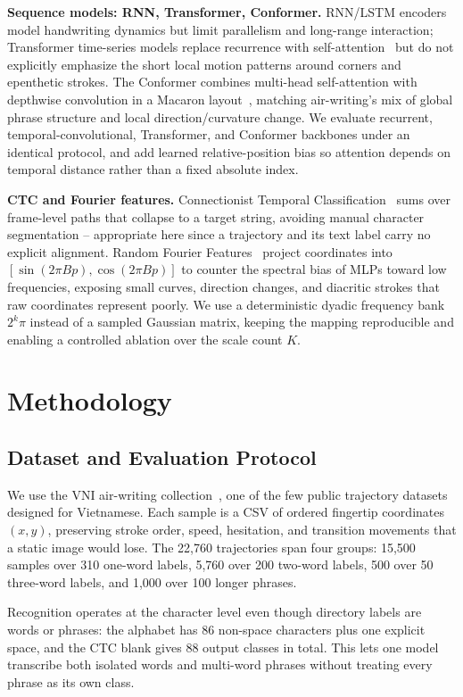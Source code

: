 \documentclass[runningheads]{llncs}
\begin{document}
\noindent\textbf{Sequence models: RNN, Transformer, Conformer.} RNN/LSTM encoders~\cite{rumelhart,hochreiter,ott} model handwriting dynamics but limit parallelism and long-range interaction; Transformer time-series models replace recurrence with self-attention~\cite{zerveas,zheng} but do not explicitly emphasize the short local motion patterns around corners and epenthetic strokes. The Conformer combines multi-head self-attention with depthwise convolution in a Macaron layout~\cite{conformer}, matching air-writing's mix of global phrase structure and local direction/curvature change. We evaluate recurrent, temporal-convolutional, Transformer, and Conformer backbones under an identical protocol, and add learned relative-position bias so attention depends on temporal distance rather than a fixed absolute index.

\noindent\textbf{CTC and Fourier features.} Connectionist Temporal Classification~\cite{ctc} sums over frame-level paths that collapse to a target string, avoiding manual character segmentation -- appropriate here since a trajectory and its text label carry no explicit alignment. Random Fourier Features~\cite{fourier} project coordinates into $[\sin(2\pi Bp),\cos(2\pi Bp)]$ to counter the spectral bias of MLPs toward low frequencies, exposing small curves, direction changes, and diacritic strokes that raw coordinates represent poorly. We use a deterministic dyadic frequency bank $2^k\pi$ instead of a sampled Gaussian matrix, keeping the mapping reproducible and enabling a controlled ablation over the scale count $K$.

\section{Methodology}
\subsection{Dataset and Evaluation Protocol}
\label{sec:protocol}
We use the VNI air-writing collection~\cite{vni}, one of the few public trajectory datasets designed for Vietnamese. Each sample is a CSV of ordered fingertip coordinates $(x,y)$, preserving stroke order, speed, hesitation, and transition movements that a static image would lose. The 22,760 trajectories span four groups: 15,500 samples over 310 one-word labels, 5,760 over 200 two-word labels, 500 over 50 three-word labels, and 1,000 over 100 longer phrases.

Recognition operates at the character level even though directory labels are words or phrases: the alphabet has 86 non-space characters plus one explicit space, and the CTC blank gives 88 output classes in total. This lets one model transcribe both isolated words and multi-word phrases without treating every phrase as its own class.
\end{document}
